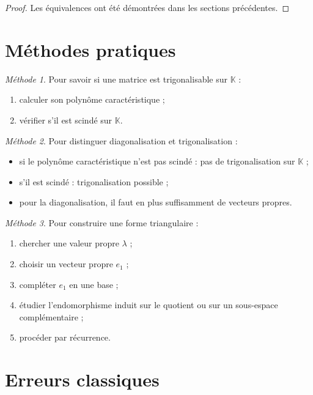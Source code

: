 \documentclass[11pt,a4paper]{article}
\theoremstyle{remark}
\newtheorem*{methode}{Méthode}
\newcommand{\K}{\mathbb{K}}
\begin{document}
\begin{proof}
Les équivalences ont été démontrées dans les sections précédentes.
\end{proof}

\section{Méthodes pratiques}

\begin{methode}
Pour savoir si une matrice est trigonalisable sur \(\K\) :
\begin{enumerate}
    \item calculer son polynôme caractéristique ;
    \item vérifier s’il est scindé sur \(\K\).
\end{enumerate}
\end{methode}

\begin{methode}
Pour distinguer diagonalisation et trigonalisation :
\begin{itemize}
    \item si le polynôme caractéristique n’est pas scindé : pas de trigonalisation sur \(\K\) ;
    \item s’il est scindé : trigonalisation possible ;
    \item pour la diagonalisation, il faut en plus suffisamment de vecteurs propres.
\end{itemize}
\end{methode}

\begin{methode}
Pour construire une forme triangulaire :
\begin{enumerate}
    \item chercher une valeur propre \(\lambda\) ;
    \item choisir un vecteur propre \(e_1\) ;
    \item compléter \(e_1\) en une base ;
    \item étudier l’endomorphisme induit sur le quotient ou sur un sous-espace complémentaire ;
    \item procéder par récurrence.
\end{enumerate}
\end{methode}

\section{Erreurs classiques}
\end{document}
